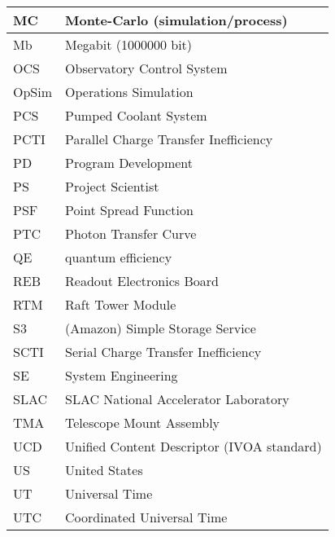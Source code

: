 \begin{longtable}{p{}p{}}
MC & Monte-Carlo (simulation/process) \\\hline
Mb & Megabit (1000000 bit) \\\hline
OCS & Observatory Control System \\\hline
OpSim & Operations Simulation \\\hline
PCS & Pumped Coolant System \\\hline
PCTI & Parallel Charge Transfer Inefficiency \\\hline
PD & Program Development \\\hline
PS & Project Scientist \\\hline
PSF & Point Spread Function \\\hline
PTC & Photon Transfer Curve \\\hline
QE & quantum efficiency \\\hline
REB & Readout Electronics Board \\\hline
RTM & Raft Tower Module \\\hline
S3 & (Amazon) Simple Storage Service \\\hline
SCTI & Serial Charge Transfer Inefficiency \\\hline
SE & System Engineering \\\hline
SLAC & SLAC National Accelerator Laboratory \\\hline
TMA & Telescope Mount Assembly \\\hline
UCD & Unified Content Descriptor (IVOA standard) \\\hline
US & United States \\\hline
UT & Universal Time \\\hline
UTC & Coordinated Universal Time \\\hline
\end{longtable}
